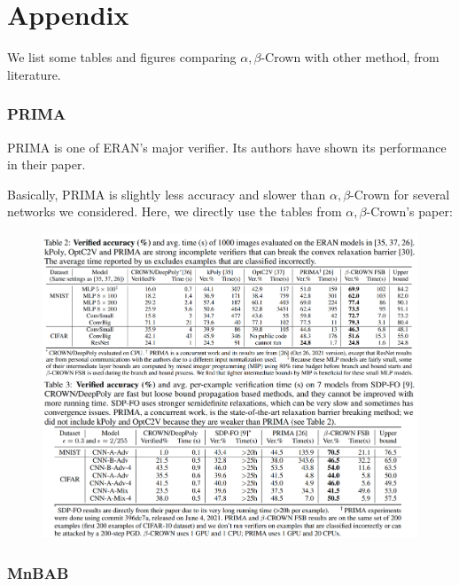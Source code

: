 \section*{Appendix}

We list some tables and figures comparing $\alpha,\beta$-Crown with other method, from literature.

\subsubsection*{PRIMA} 

PRIMA is one of ERAN's major verifier. Its authors have shown its performance in their paper.

Basically, PRIMA is slightly less accuracy and slower than $\alpha,\beta$-Crown for several networks we considered. Here, we directly use the tables from $\alpha,\beta$-Crown's paper:

\begin{figure}[h]
	\includegraphics[scale=0.32]{Cronw_PRIMA.png}
\end{figure}


\subsubsection*{MnBAB} 


